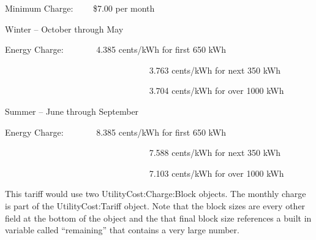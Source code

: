 Minimum Charge:~~~~ \$7.00 per month

Winter -- October through May

Energy Charge:~~~~~~~ 4.385 cents/kWh for first 650 kWh

~~~~~~~~~~~~~~~~~~~~~~~~~~~~~~~~~ 3.763 cents/kWh for next 350 kWh

~~~~~~~~~~~~~~~~~~~~~~~~~~~~~~~~~ 3.704 cents/kWh for over 1000 kWh

Summer -- June through September

Energy Charge:~~~~~~~ 8.385 cents/kWh for first 650 kWh

~~~~~~~~~~~~~~~~~~~~~~~~~~~~~~~~~ 7.588 cents/kWh for next 350 kWh

~~~~~~~~~~~~~~~~~~~~~~~~~~~~~~~~~ 7.103 cents/kWh for over 1000 kWh

This tariff would use two UtilityCost:Charge:Block objects. The monthly charge is part of the UtilityCost:Tariff object. Note that the block sizes are every other field at the bottom of the object and the that final block size references a built in variable called ``remaining'' that contains a very large number.

